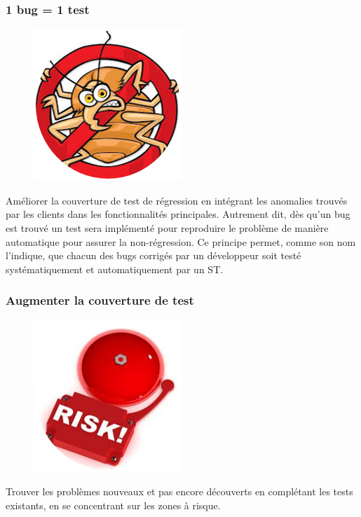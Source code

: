 \subsubsection{1 bug = 1 test}
\begin{figure}[H]
  \centering
      \includegraphics{images/bugtest.png}
\end{figure}
Améliorer la couverture de test de régression en intégrant les anomalies trouvés par les clients dans les fonctionnalités principales. Autrement dit, dès qu'un bug est trouvé un test sera implémenté pour reproduire le problème de manière automatique pour assurer la non-régression. Ce principe permet, comme son nom l'indique, que chacun des bugs corrig\'{e}s par un d\'{e}veloppeur soit test\'{e} syst\'{e}matiquement et automatiquement par un ST.

\subsubsection{Augmenter la couverture de test}
\begin{figure}[H]
  \centering
      \includegraphics{images/testcoverage.png}
\end{figure}
Trouver les problèmes nouveaux et pas encore découverts en complétant les tests existants, en se concentrant sur les zones à risque.


